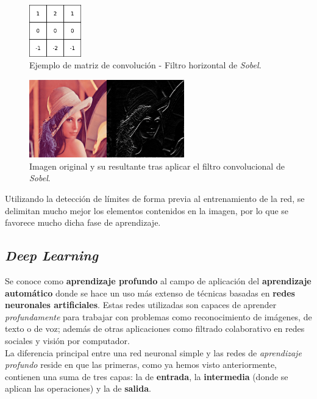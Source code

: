 \documentclass[]{scrartcl}
\begin{document}
			\begin{figure}[h]
				\centering
				\includegraphics[width=0.2\textwidth]{./img/horizontal-sobel}
				\caption{Ejemplo de matriz de convolución - Filtro horizontal de \textit{Sobel}.}
				\label{conv-filter}
			\end{figure}
		
			\begin{figure}[h]
				\centering
				\includegraphics[width=0.6\textwidth]{./img/lenna+horizontal}
				\caption{Imagen original y su resultante tras aplicar el filtro convolucional de \textit{Sobel}.}
				\label{conv-filter-result}
			\end{figure}
		
			Utilizando la detección de límites de forma previa al entrenamiento de la red, se delimitan mucho mejor los elementos contenidos en la imagen, por lo que se favorece mucho dicha fase de aprendizaje.
	
	\subsection{\textit{Deep Learning}}
	
		Se conoce como \textbf{aprendizaje profundo} al campo de aplicación del \textbf{aprendizaje automático} donde se hace un uso más extenso de técnicas basadas en \textbf{redes neuronales artificiales}. Estas redes utilizadas son capaces de aprender \textit{profundamente} para trabajar con problemas como reconocimiento de imágenes, de texto o de voz; además de otras aplicaciones como filtrado colaborativo en redes sociales y visión por computador.\\
		
		La diferencia principal entre una red neuronal simple y las redes de \textit{aprendizaje profundo} reside en que las primeras, como ya hemos visto anteriormente, contienen una suma de tres capas: la de \textbf{entrada}, la \textbf{intermedia} (donde se aplican las operaciones) y la de \textbf{salida}.\\
		
\end{document}
